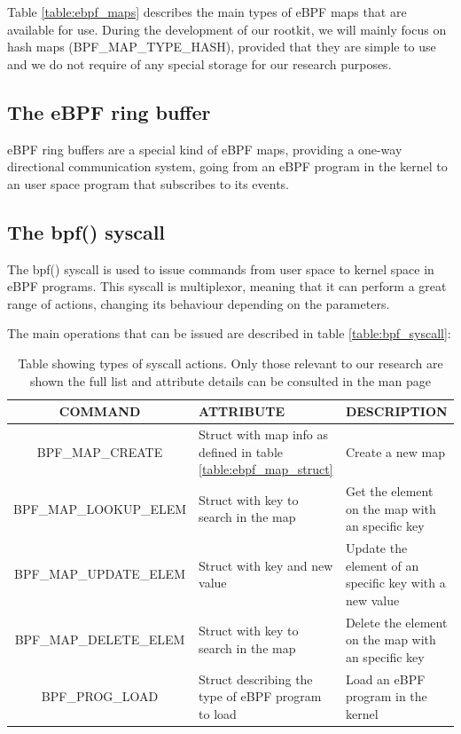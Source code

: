 \documentclass[12pt]{report} %
\begin{document}
Table \ref{table:ebpf_maps} describes the main types of eBPF maps that are available for use. During the development of our rootkit, we will mainly focus on hash maps (BPF\_MAP\_TYPE\_HASH), provided that they are simple to use and we do not require of any special storage for our research purposes.

\subsection{The eBPF ring buffer} \label{subsection:bpf_ring_buf}
eBPF ring buffers are a special kind of eBPF maps, providing a one-way directional communication system, going from an eBPF program in the kernel to an user space program that subscribes to its events.


\subsection{The bpf() syscall} \label{subsection:bpf_syscall}
The bpf() syscall is used to issue commands from user space to kernel space in eBPF programs. This syscall is multiplexor, meaning that it can perform a great range of actions, changing its behaviour depending on the parameters.

The main operations that can be issued are described in table \ref{table:bpf_syscall}:

\begin{table}[H]
\begin{tabular}{|c|>{\centering\arraybackslash}p{5cm}|>{\centering\arraybackslash}p{5cm}|}
\hline
COMMAND & ATTRIBUTE & DESCRIPTION\\
\hline
\hline
BPF\_MAP\_CREATE & Struct with map info as defined in table \ref{table:ebpf_map_struct} & Create a new map\\
\hline
BPF\_MAP\_LOOKUP\_ELEM & Struct with key to search in the map & Get the element on the map with an specific key\\
\hline
BPF\_MAP\_UPDATE\_ELEM & Struct with key and new value & Update the element of an specific key with a new value\\
\hline
BPF\_MAP\_DELETE\_ELEM & Struct with key to search in the map & Delete the element on the map with an specific key\\
\hline
BPF\_PROG\_LOAD & Struct describing the type of eBPF program to load & Load an eBPF program in the kernel\\
\hline
\end{tabular}
\caption{Table showing types of syscall actions. Only those relevant to our research are shown the full list and attribute details can be consulted in the man page \cite{bpf_syscall}}
\label{table:ebpf_syscall}
\end{table}
\end{document}
